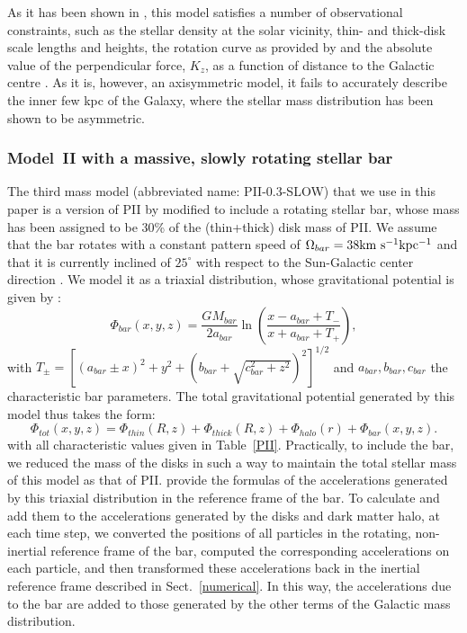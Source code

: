         As it has been shown in \citet{2017A&A...598A..66P}, this model satisfies a number of observational constraints, such as the stellar density at the solar vicinity, thin- and thick-disk scale lengths and heights, the rotation curve as provided by \citet{2014ApJ...783..130R}  and the absolute value of the perpendicular force, $K_z$, as a function of distance to the Galactic centre \citep[see Sect.~2.5 in][]{2017A&A...598A..66P}. As it is, however, an axisymmetric model, it fails to  accurately describe the inner few kpc of the Galaxy, where the stellar mass distribution has been shown to be asymmetric.     

    \subsubsection{Model~II with a massive, slowly rotating stellar bar}
        The third mass model (abbreviated name: PII-0.3-SLOW)  that we use in this paper is a version of PII by \citet{2017A&A...598A..66P} modified to include a rotating stellar bar, whose mass has been assigned to be 30\% of the (thin+thick) disk mass of PII. We assume that the bar rotates with a constant pattern speed of $\Omega_{bar}=38\rm km~s^{-1}kpc^{-1}$ and that it is currently inclined of $25^\circ$ with respect to the Sun-Galactic center direction \citep[see][]{2016ARA&A..54..529B}. We model it as a triaxial distribution, whose gravitational potential is given by  \citet{1992ApJ...397...44L}:
        \begin{equation}
            \Phi_{bar}(x,y,z)=\frac{GM_{bar}}{2a_{bar}}\ln\left( \frac{x-a_{bar}+T_{-}}{x+a_{bar}+T_{+}}   \right),
        \end{equation}
        with $T_{\pm}=\left[ (a_{bar}\pm x)^2+ y^2 +  (b_{bar}+ \sqrt{c_{bar}^2+z^2})^2 \right]^{1/2}$
        and $a_{bar}, b_{bar}, c_{bar}$ the characteristic bar parameters. The total gravitational potential generated by this model thus takes the form:
        \begin{equation}
            \Phi_{tot}(x, y, z) = \Phi_{thin}(R, z) + \Phi_{thick}(R, z) + \Phi_{halo}(r)+  \Phi_{bar}(x, y, z).
        \end{equation}
        with all characteristic values given in Table~\ref{PII}. Practically, to include the bar, we reduced the mass of the disks in such a way to maintain the total stellar mass of this model as that of PII.  \citet{1992ApJ...397...44L} provide the formulas of the accelerations generated by this triaxial distribution in the reference frame of the bar. To calculate and add them to the accelerations generated by the disks and dark matter halo, at each time step, we converted the positions of all particles  in the rotating, non-inertial reference frame of the bar, computed the corresponding accelerations on each particle, and then transformed these accelerations back in the inertial reference frame described in Sect.~\ref{numerical}. In this way, the accelerations due to the bar are added to those generated by the other terms of the Galactic mass distribution. 

